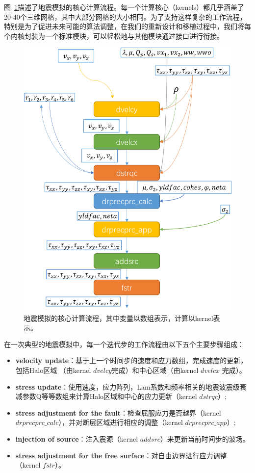 \documentclass[degree=doctor]{thuthesis}
\begin{document}
图~\ref{fig:awp-workflow}描述了地震模拟的核心计算流程。每一个计算核心（kernels）都几乎涵盖了20-40个三维网格，其中大部分网格的大小相同。为了支持这样复杂的工作流程，特别是为了促进未来可能的算法调整，在我们的重新设计和移植过程中，我们将每个内核封装为一个标准模块，可以轻松地与其他模块通过接口进行衔接。

\begin{figure}[h]
\centering
\includegraphics[width=0.8\columnwidth]{awp_chart.jpg}
\caption{地震模拟的核心计算流程，其中变量以数组表示，计算以kernel表示。}
\label{fig:awp-workflow}
\end{figure}

在一次典型的地震模拟中，每一个迭代步的工作流程由以下五个主要步骤组成：

\begin{itemize}
\item {\bf velocity update}：基于上一个时间步的速度和应力数组，完成速度的更新，包括Halo区域 （由kernel $dvelcy$完成）和中心区域（由kernel $dvelcx$ 完成）。

\item {\bf stress update}：使用速度，应力阵列，Lam系数和频率相关的地震波震级衰减参数Q等等数组来计算Halo区域和中心的应力更新（kernel $dstrqc$）;

\item {\bf stress adjustment for the fault}：检查屈服应力是否越界（kernel $drprecprc\_calc$），并对断层区域进行相应的调整（kernel $drprecprc\_app$）;

\item {\bf injection of source}：注入震源（kernel $addsrc$）来更新当前时间步的波场。

\item {\bf stress adjustment for the free surface}：对自由边界进行应力调整（kernel $fstr$）。
\end{itemize}
\end{document}
